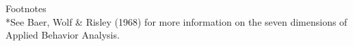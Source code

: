 %
\begin{refsection}
\nocite{baer1968some,
        cooper2007applied,
        gresham1993treatment,
        johnston2010strategies,
        peterson1982integrity}
\printbibliography[heading=none]
\end{refsection}
%
\fourbEleven{}\\
\fouriOne{}\\
\fouriFour{}\\
\fourjOne{}\\
\fourFKSeven{}\\
\fourFKEleven{}\\
\fourFKThirtyThree{}\\
%
Footnotes\\
*See Baer, Wolf \& Risley (1968) for more information on the seven dimensions of Applied Behavior Analysis.
